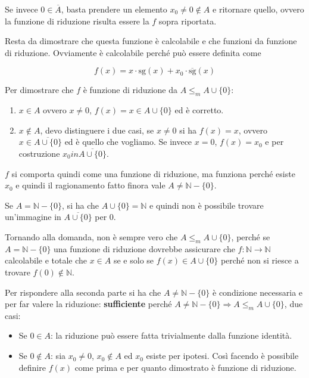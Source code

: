 Se invece $0 \in \overline{A}$, basta prendere un elemento $x_0 \neq 0 \notin A$ e ritornare quello, ovvero la funzione di riduzione risulta essere la $f$ sopra riportata.

Resta da dimostrare che questa funzione è calcolabile e che funzioni da funzione di riduzione.
Ovviamente è calcolabile perché può essere definita come

$$
f(x) = x \cdot \text{sg}(x) + x_0 \cdot  \overline{\text{sg}}(x)
$$

Per dimostrare che $f$ è funzione di riduzione da $A \leq_m A \cup \{0\}$:

\begin{enumerate}
	\item $x \in A$ ovvero $x \neq 0$, $f(x) = x \in A\cup\{0\}$ ed è corretto.
	\item $x \notin A$, devo distinguere i due casi, se $x \neq 0$ si ha $f(x) = x$, ovvero $x \in \overline{A \cup \{0\}} $ ed è quello che vogliamo. Se invece $x = 0$, $f(x) = x_0$ e per costruzione $x_0 in \overline{A \cup \{0\}}$.
\end{enumerate}

$f$ si comporta quindi come una funzione di riduzione, ma funziona perché esiste $x_0$ e quindi il ragionamento fatto finora vale $A \neq \mathbb{N}  - \{0\}$.

Se $A = \mathbb{N}  - \{0\}$, si ha che $A \cup \{0\} = \mathbb{N}$ e quindi non è possibile trovare un'immagine in $\overline{A \cup \{0\}}$ per $0$.

Tornando alla domanda, non è sempre vero che $A \leq_m A \cup \{0\}$, perché se $A = \mathbb{N}-\{0\}$ una funzione di riduzione dovrebbe assicurare che $f : \mathbb{N} \rightarrow \mathbb{N}$ calcolabile e totale che $x \in A$ se e solo se $f(x) \in A \cup \{0\}$ perché non si riesce a trovare $f(0) \notin \mathbb{N}$.

Per rispondere alla seconda parte si ha che $A \neq \mathbb{N} - \{0\}$ è condizione necessaria e \textbf{} per far valere la riduzione: \textbf{sufficiente} perché $A \neq \mathbb{N} - \{0\} \Rightarrow A \leq_m A \cup \{0\}$, due casi:

\begin{itemize}
	\item Se $0 \in A$: la riduzione può essere fatta trivialmente dalla funzione identità.
	\item Se $0 \notin A $: sia $x_0 \neq 0$, $x_0 \notin A$ ed $x_0$ esiste per ipotesi. Così facendo è possibile definire $f(x)$ come prima e per quanto dimostrato è funzione di riduzione. 
\end{itemize}

